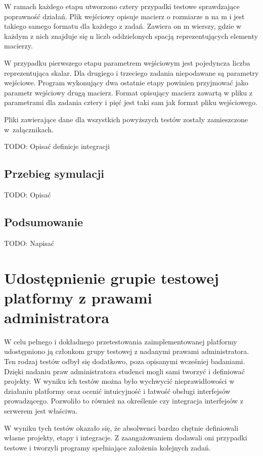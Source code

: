 W ramach każdego etapu utworzono cztery przypadki testowe sprawdzające poprawność działań.
Plik wejściowy opisuje macierz o rozmiarze n na m i jest takiego samego formatu dla każdego z zadań.
Zawiera on m wierszy, gdzie w każdym z nich znajduje się n liczb oddzielonych spacją reprezentujących elementy macierzy.

W przypadku pierwszego etapu parametrem wejściowym jest pojedyncza liczba reprezentująca skalar.
Dla drugiego i trzeciego zadania niepodawane są parametry wejściowe.
Program wykonujący dwa ostatnie etapy powinien przyjmować jako parametr wejściowy drugą macierz.
Format opisujący macierz zawartą w pliku z parametrami dla zadania cztery i pięć jest taki sam jak format pliku wejściowego.

Pliki zawierające dane dla wszystkich powyższych testów zostały zamieszczone w~załącznikach.

TODO: Opisać definicje integracji

\subsection{Przebieg symulacji}
\label{matrix_simulation}

TODO: Opisać


\subsection{Podsumowanie}

TODO: Napisać


\section{Udostępnienie grupie testowej platformy z prawami administratora}

W celu pełnego i dokładnego przetestowania zaimplementowanej platformy udostępniono ją członkom grupy testowej z nadanymi prawami administratora.
Ten rodzaj testów odbył się dodatkowo, poza opisanymi wcześniej badaniami.
Dzięki nadaniu praw administratora studenci mogli sami tworzyć i definiować projekty.
W wyniku ich testów można było wychwycić nieprawidłowości w działaniu platformy oraz ocenić intuicyjność i łatwość obsługi interfejsów prowadzącego.
Pozwoliło to również na określenie czy integracja interfejsów z serwerem jest właściwa.

W wyniku tych testów okazało się, że absolwenci bardzo chętnie definiowali własne projekty, etapy i integracje.
Z zaangażowaniem dodawali oni przypadki testowe i tworzyli programy spełniające założenia kolejnych zadań.

